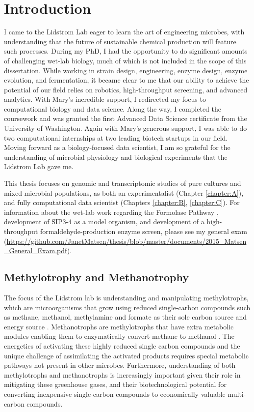 \chapter{Introduction}

I came to the Lidstrom Lab eager to learn the art of engineering microbes, with understanding that the future of sustainable chemical production will feature such processes.
During my PhD, I had the opportunity to do significant amounts of challenging wet-lab biology, much of which is not included in the scope of this dissertation.
While working in strain design, engineering, enzyme design, enzyme evolution, and fermentation, it became clear to me that our ability to achieve the potential of our field relies on robotics, high-throughput screening, and advanced analytics.
With Mary's incredible support, I redirected my focus to computational biology and data science.
Along the way, I completed the coursework and was granted the first Advanced Data Science certificate from the University of Washington.
Again with Mary's generous support, I was able to do two computational internships at two leading biotech startups in our field.
Moving forward as a biology-focused data scientist, I am so grateful for the understanding of microbial physiology and biological experiments that the Lidstrom Lab gave me.

This thesis focuses on genomic and transcriptomic studies of pure cultures and mixed microbial populations, as both an experimentalist (Chapter \ref{chapter:A}), and fully computational data scientist (Chapters \ref{chapter:B}, \ref{chapter:C}).
For information about the wet-lab work regarding the Formolase Pathway \cite{siegel2015}, development of SIP3-4 as a model organism, and development of a high-throughput formaldehyde-production enzyme screen, please see my general exam (\url{https://github.com/JanetMatsen/thesis/blob/master/documents/2015_Matsen_General_Exam.pdf}).

\section{Methylotrophy and Methanotrophy}
The focus of the Lidstrom lab is understanding and manipulating methylotrophs, which are microorganisms that grow using reduced single-carbon compounds such as methane, methanol, methylamine and formate as their sole carbon source and energy source \cite{anthony1982,mila2009}.
Methanotrophs are methylotrophs that have extra metabolic modules enabling them to enzymatically convert methane to methanol \cite{kalyuzhnaya2015}.
The energetics of activating these highly reduced single carbon compounds and the unique challenge of assimilating the activated products requires special metabolic pathways not present in other microbes.
Furthermore, understanding of both methylotrophs and methanotrophs is increasingly important given their role in mitigating these greenhouse gases, and their biotechnological potential for converting inexpensive single-carbon compounds to economically valuable multi-carbon compounds.

